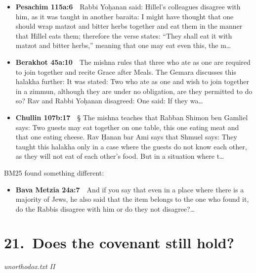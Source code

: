 \documentclass[11pt,a4paper]{article}
\begin{document}
\begin{itemize}[leftmargin=1.2em,itemsep=3pt]
\item {\color{ref}\textbf{Pesachim 115a:6}}\ \ Rabbi Yoḥanan said: Hillel’s colleagues disagree with him, as it was taught in another baraita: I might have thought that one should wrap matzot and bitter herbs together and eat them in the manner that Hillel eats them; therefore the verse states: “They shall eat it with matzot and bitter herbs,” meaning that one may eat even this, the m\ldots
\item {\color{ref}\textbf{Berakhot 45a:10}}\ \ The mishna rules that three who ate as one are required to join together and recite Grace after Meals. The Gemara discusses this halakha further: It was stated: Two who ate as one and wish to join together in a zimmun, although they are under no obligation, are they permitted to do so? Rav and Rabbi Yoḥanan disagreed: One said: If they wa\ldots
\item {\color{ref}\textbf{Chullin 107b:17}}\ \ § The mishna teaches that Rabban Shimon ben Gamliel says: Two guests may eat together on one table, this one eating meat and that one eating cheese. Rav Ḥanan bar Ami says that Shmuel says: They taught this halakha only in a case where the guests do not know each other, as they will not eat of each other’s food. But in a situation where t\ldots
\end{itemize}
{\color{quiet}\small BM25 found something different:}
\begin{itemize}[leftmargin=1.2em]
\item {\color{ref}\textbf{Bava Metzia 24a:7}}\ \ And if you say that even in a place where there is a majority of Jews, he also said that the item belongs to the one who found it, do the Rabbis disagree with him or do they not disagree?\ldots
\end{itemize}

\section*{21.\ Does the covenant still hold?}
{\color{quiet}\small\textit{unorthodox.txt II}}
\end{document}
